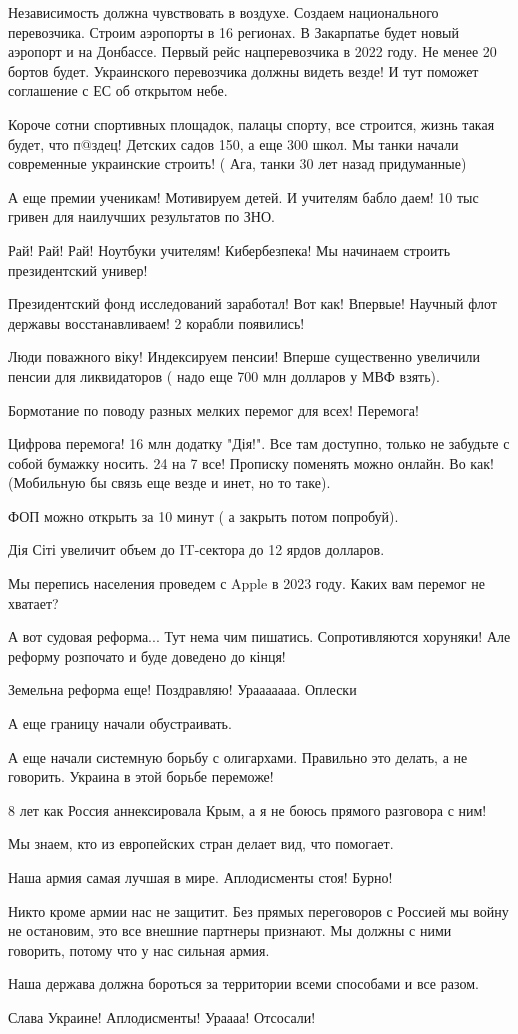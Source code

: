 Независимость должна чувствовать в воздухе. Создаем национального перевозчика.
Строим аэропорты в 16 регионах. В Закарпатье будет новый аэропорт и на
Донбассе. Первый рейс нацперевозчика в 2022 году. Не менее 20 бортов будет.
Украинского перевозчика должны видеть везде! И тут поможет соглашение с ЕС об
открытом небе.

Короче сотни спортивных площадок, палацы спорту, все строится, жизнь такая
будет, что п@здец! Детских садов 150, а еще 300 школ. Мы танки начали
современные украинские строить! ( Ага, танки 30 лет назад придуманные)

А еще премии ученикам! Мотивируем детей. И учителям бабло даем! 10 тыс гривен
для наилучших результатов по ЗНО. 

Рай! Рай! Рай! Ноутбуки учителям! Кибербезпека! Мы начинаем строить
президентский универ! 

Президентский фонд исследований заработал! Вот как! Впервые! Научный флот
державы восстанавливаем! 2 корабли появились!

Люди поважного віку! Индексируем пенсии! Вперше существенно увеличили пенсии
для ликвидаторов ( надо еще 700 млн долларов у МВФ взять). 

Бормотание по поводу разных мелких перемог для всех! Перемога!

Цифрова перемога! 16 млн додатку "Дія!". Все там доступно, только не забудьте с
собой бумажку носить. 24 на 7 все! Прописку поменять можно онлайн. Во как!
(Мобильную бы связь еще везде и инет, но то таке). 

ФОП можно открыть за 10 минут ( а закрыть потом попробуй).

Дія Сіті увеличит объем до IT-сектора до 12 ярдов долларов. 

Мы перепись населения проведем с Apple в 2023 году. Каких вам перемог не
хватает? 

А вот судовая реформа... Тут нема чим пишатись. Сопротивляются хоруняки! Але
реформу розпочато и буде доведено до кінця!

Земельна реформа еще! Поздравляю! Урааааааа. Оплески

А еще границу начали обустраивать. 

А еще начали системную борьбу с олигархами. Правильно это делать, а не
говорить. Украина в этой борьбе переможе! 

8 лет как Россия аннексировала Крым, а я не боюсь прямого разговора с ним! 

Мы знаем, кто из европейских стран делает вид, что помогает. 

Наша армия самая лучшая в мире. Аплодисменты стоя! Бурно! 

Никто кроме армии нас не защитит. Без прямых переговоров с Россией мы войну не
остановим, это все внешние партнеры признают. Мы должны с ними говорить, потому
что у нас сильная армия. 

Наша держава должна бороться за территории всеми способами и все разом. 

Слава Украине! Аплодисменты! Ураааа! Отсосали!

